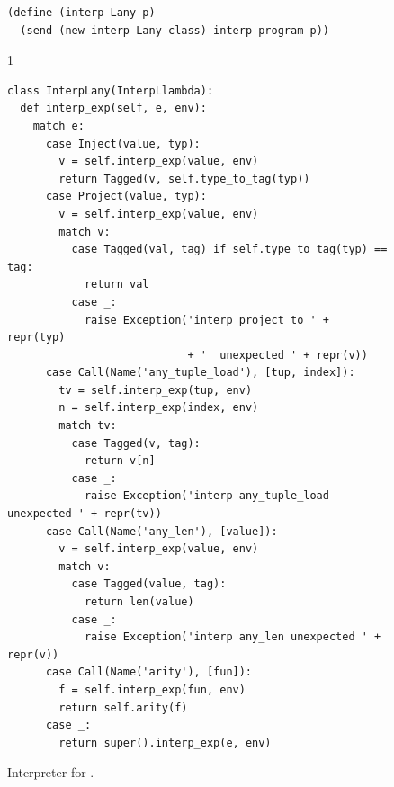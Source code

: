 \documentclass[7x10]{TimesAPriori_MIT}%
\def\pythonEd{1}
\def\edition{1}
\newcommand{\pythonColor}[0]{}
\numberwithin{theorem}{chapter}
\numberwithin{definition}{chapter}
\numberwithin{equation}{chapter}
\begin{document}
\begin{figure}[btp]
\begin{tcolorbox}[colback=white]
{\begin{lstlisting}[basicstyle=\ttfamily\footnotesize]
(define (interp-Lany p)
  (send (new interp-Lany-class) interp-program p))
\end{lstlisting}
\fi}
{\if\edition\pythonEd\pythonColor
\begin{lstlisting}[basicstyle=\ttfamily\footnotesize]
class InterpLany(InterpLlambda):
  def interp_exp(self, e, env):
    match e:
      case Inject(value, typ):
        v = self.interp_exp(value, env)
        return Tagged(v, self.type_to_tag(typ))
      case Project(value, typ):
        v = self.interp_exp(value, env)
        match v:
          case Tagged(val, tag) if self.type_to_tag(typ) == tag:
            return val
          case _:
            raise Exception('interp project to ' + repr(typ)
                            + '  unexpected ' + repr(v))
      case Call(Name('any_tuple_load'), [tup, index]):
        tv = self.interp_exp(tup, env)
        n = self.interp_exp(index, env)
        match tv:
          case Tagged(v, tag):
            return v[n]
          case _:
            raise Exception('interp any_tuple_load unexpected ' + repr(tv))
      case Call(Name('any_len'), [value]):
        v = self.interp_exp(value, env)
        match v:
          case Tagged(value, tag):
            return len(value)
          case _:
            raise Exception('interp any_len unexpected ' + repr(v))
      case Call(Name('arity'), [fun]):
        f = self.interp_exp(fun, env)
        return self.arity(f)
      case _:
        return super().interp_exp(e, env)
\end{lstlisting}
\fi}
  \end{tcolorbox}
\caption{Interpreter for \LangAny{}.}
\label{fig:interp-Lany}
\end{figure}
\end{document}
